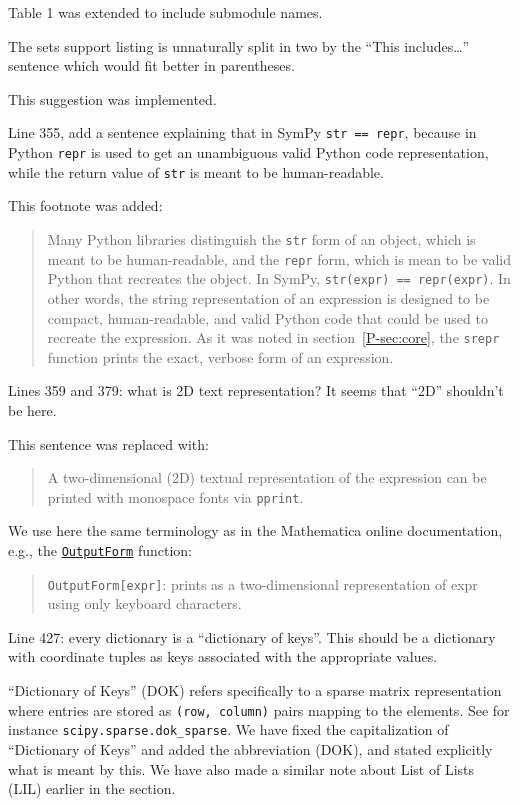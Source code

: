 \documentclass[answers,12pt]{exam}
\begin{document}
\begin{questions}
\begin{solution}
Table 1 was extended to include submodule names.
\end{solution}

\question The sets support listing is unnaturally split in two by the ``This includes\ldots'' sentence which would fit better in parentheses.
\begin{solution}
This suggestion was implemented.
\end{solution}

\question Line 355, add a sentence explaining that in SymPy \texttt{str == repr}, because in Python \texttt{repr} is used to get an unambiguous valid Python code representation, while the return value of \texttt{str} is meant to be human-readable.
\begin{solution}
This footnote was added:
\begin{quote}
  Many Python libraries distinguish the \texttt{str} form of an object, which
  is meant to be human-readable, and the \texttt{repr} form, which is mean to
  be valid Python that recreates the object. In SymPy, \texttt{str(expr) ==
    repr(expr)}. In other words, the string representation of an expression is
  designed to be compact, human-readable, and valid Python code that could be
  used to recreate the expression. As it was noted in section~\ref{P-sec:core},
  the \texttt{srepr} function prints the exact, verbose form of an expression.
\end{quote}
\end{solution}

\question Lines 359 and 379: what is 2D text representation? It seems that ``2D'' shouldn't be here.
\begin{solution}
This sentence was replaced with:
\begin{quote}
A two-dimensional (2D) textual representation of the expression can
be printed with monospace fonts via \verb|pprint|.
\end{quote}
We use here the same terminology as in the Mathematica
online documentation, e.g., the
\href{https://reference.wolfram.com/language/ref/OutputForm.html}{\texttt{OutputForm}}
function:
\begin{quote}
\texttt{OutputForm[expr]}: prints as a two-dimensional representation of expr using only keyboard characters.
\end{quote}
\end{solution}

\question Line 427: every dictionary is a ``dictionary of keys''. This should be a dictionary with coordinate tuples as keys associated with the appropriate values.
\begin{solution}
``Dictionary of Keys'' (DOK) refers specifically to a sparse matrix
representation where entries are stored as \texttt{(row, column)} pairs
mapping to the elements. See for instance \texttt{scipy.sparse.dok\_sparse}. We
have fixed the capitalization of ``Dictionary of Keys'' and added the
abbreviation (DOK), and stated explicitly what is meant by this. We have also
made a similar note about List of Lists (LIL) earlier in the section.
\end{solution}


\end{questions}
\end{document}
